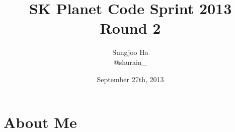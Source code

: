 

\usepackage{kotex}
\usepackage{multirow}
\usepackage{tikz}
\usepackage{graphicx}
\usepackage[normal, tight, center]{subfigure}
\usepackage{amssymb}
\usepackage{pgf}
\usepackage{url}
\usepackage{mathrsfs}
\usepackage{mathtools}
\usepackage{algorithm2e}
\usepackage{setspace}
\usepackage{fancyvrb}


\DeclareMathOperator*{\argmin}{\arg\!\min}
\DeclareMathOperator*{\argmax}{\arg\!\max}




\def\supertiny{ \font\supertinyfont = cmr10 at 7pt \relax \supertinyfont}


\title[\hspace{2em}\insertframenumber/\inserttotalframenumber]{SK Planet Code Sprint 2013 Round 2}
\author[Sungjoo Ha]{Sungjoo Ha \\ @shurain{\Huge \_}}
\date{September 27th, 2013}




\frame {
\maketitle
}


\section{About Me}

